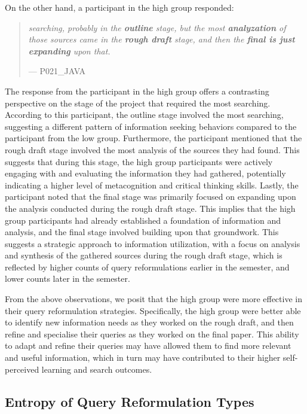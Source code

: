 \documentclass[letterpaper, nobind]{templates/ociamthesis}
\begin{document}
On the other hand, a participant in the high group responded:

\begin{quote}
\emph{searching, probably in the \textbf{outline} stage, but the most \textbf{analyzation} of those sources came in the \textbf{rough draft} stage, and then the \textbf{final is just expanding} upon that.}

\hfill --- P021\_JAVA
\end{quote}

The response from the participant in the high group offers a contrasting perspective on the stage of the project that required the most searching. According to this participant, the outline stage involved the most searching, suggesting a different pattern of information seeking behaviors compared to the participant from the low group.
Furthermore, the participant mentioned that the rough draft stage involved the most analysis of the sources they had found. This suggests that during this stage, the high group participants were actively engaging with and evaluating the information they had gathered, potentially indicating a higher level of metacognition and critical thinking skills.
Lastly, the participant noted that the final stage was primarily focused on expanding upon the analysis conducted during the rough draft stage. This implies that the high group participants had already established a foundation of information and analysis, and the final stage involved building upon that groundwork.
This suggests a strategic approach to information utilization, with a focus on analysis and synthesis of the gathered sources during the rough draft stage, which is reflected by higher counts of query reformulations earlier in the semester, and lower counts later in the semester.

From the above observations, we posit that the high group were more effective in their query reformulation strategies.
Specifically, the high group were better able to identify new information needs as they worked on the rough draft, and then refine and specialise their queries as they worked on the final paper.
This ability to adapt and refine their queries may have allowed them to find more relevant and useful information, which in turn may have contributed to their higher self-perceived learning and search outcomes.

\hypertarget{sec-res-phase2-query-H}{%
\subsection{Entropy of Query Reformulation Types}\label{sec-res-phase2-query-H}}
\end{document}
